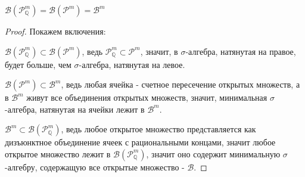 \begin{consequence} \thmslashn

  $\mathcal{B}(\mathcal{P}_{\mathbb{Q}}^m) = \mathcal{B}(\mathcal{P}^m) = \mathcal{B}^m$
  \begin{proof} \thmslashn

    Покажем включения:

    $\mathcal{B}(\mathcal{P}_{\mathbb{Q}}^m) \subset \mathcal{B}(\mathcal{P}^m)$, ведь $\mathcal{P}_{\mathbb{Q}}^m\subset\mathcal{P}^m$, значит, в $\sigma$-алгебра, натянутая на правое, будет больше, чем $\sigma$-алгебра, натянутая на левое.

    $\mathcal{B}(\mathcal{P}^m) \subset \mathcal{B}^m$, ведь любая ячейка - счетное пересечение открытых множеств, а в $\mathcal{B}^m$ живут все объединения открытых множеств, значит, минимальная $\sigma$-алгебра, натянутая на ячейки лежит в $\mathcal{B}^m$.

    $\mathcal{B}^m \subset \mathcal{B}(\mathcal{P}_{\mathbb{Q}}^m)$, ведь любое открытое множество представляется как дизъюнктное объединение ячеек с рациональными концами, значит любое открытое множество лежит в $\mathcal{B}(\mathcal{P}_{\mathbb{Q}}^m)$, значит оно содержит минимальную $\sigma$-алгебру, содержащую все открытые множество - $\mathcal{B}$.
  \end{proof}
\end{consequence}
